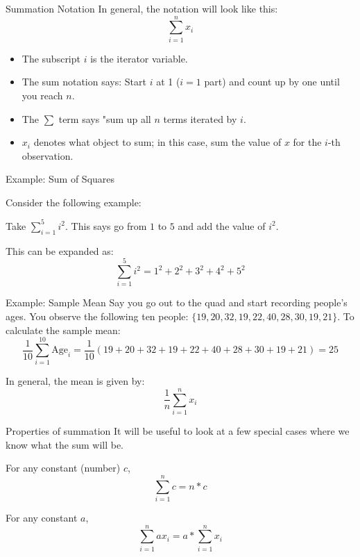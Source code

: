 \documentclass[aspectratio=169,t,11pt,table]{beamer}
\begin{document}
\begin{frame}{Summation Notation}
  In general, the notation will look like this:
  \begin{equation} 
    \sum_{i = 1}^n x_i
  \end{equation}

  \begin{itemize}
    \item The subscript $i$ is the iterator variable.

    \item The sum notation says: Start $i$ at 1 ($i = 1$ part) and count up by one until you reach $n$.
    
    \pause
    \item The $\sum$ term says "sum up all $n$ terms iterated by $i$.

    \item $x_i$ denotes what object to sum; in this case, sum the value of $x$ for the $i$-th observation.
  \end{itemize}
\end{frame}


\begin{frame}{Example: Sum of Squares}

  Consider the following example:
  
  Take $\sum_{i=1}^5 i^2$. This says go from $1$ to $5$ and add the value of $i^2$.

  This can be expanded as:  
  $$
    \sum_{i=1}^5 i^2 = 1^2 + 2^2 + 3^2 + 4^2 + 5^2
  $$
\end{frame}
  
\begin{frame}{Example: Sample Mean}
  Say you go out to the quad and start recording people's ages. You observe the following ten people: $\{ 19, 20, 32, 19, 22, 40, 28, 30, 19, 21 \}$. To calculate the sample mean:
  $$
    \frac{1}{10} \sum_{i=1}^{10} \text{Age}_i = \frac{1}{10} \left( 19 + 20 + 32 + 19 + 22 + 40 + 28 + 30 + 19 + 21 \right) = 25
  $$
  
  \pause
  In general, the mean is given by:
  $$
    \frac{1}{n} \sum_{i=1}^n x_i
  $$
\end{frame}

\begin{frame}{Properties of summation}
  It will be useful to look at a few special cases where we know what the sum will be.

  For any constant (number) $c$,
  \begin{equation*}
    \sum_{i=1}^n c = n*c
  \end{equation*}

  \pause
  \bigskip
  For any constant $a$, 
  \begin{equation*}
    \sum_{i=1}^n a x_i = a * \sum_{i=1}^n x_i
  \end{equation*}

\end{frame}
\end{document}
